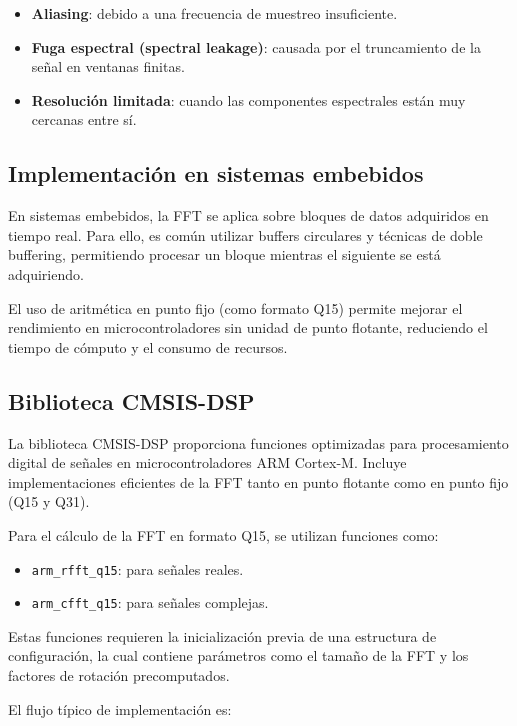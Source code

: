 \documentclass[12pt]{article}
\begin{document}
    \begin{itemize}
        \item \textbf{Aliasing}: debido a una frecuencia de muestreo insuficiente.
        \item \textbf{Fuga espectral (spectral leakage)}: causada por el truncamiento de la señal en ventanas finitas.
        \item \textbf{Resolución limitada}: cuando las componentes espectrales están muy cercanas entre sí.
    \end{itemize}

    \subsection{Implementación en sistemas embebidos}

    En sistemas embebidos, la FFT se aplica sobre bloques de datos adquiridos en tiempo real. Para ello, es común utilizar buffers circulares y técnicas de doble buffering, permitiendo procesar un bloque mientras el siguiente se está adquiriendo.

    El uso de aritmética en punto fijo (como formato Q15) permite mejorar el rendimiento en microcontroladores sin unidad de punto flotante, reduciendo el tiempo de cómputo y el consumo de recursos.

    \subsection{Biblioteca CMSIS-DSP}

    La biblioteca CMSIS-DSP proporciona funciones optimizadas para procesamiento digital de señales en microcontroladores ARM Cortex-M. Incluye implementaciones eficientes de la FFT tanto en punto flotante como en punto fijo (Q15 y Q31).

    Para el cálculo de la FFT en formato Q15, se utilizan funciones como:

    \begin{itemize}
        \item \texttt{arm\_rfft\_q15}: para señales reales.
        \item \texttt{arm\_cfft\_q15}: para señales complejas.
    \end{itemize}

    Estas funciones requieren la inicialización previa de una estructura de configuración, la cual contiene parámetros como el tamaño de la FFT y los factores de rotación precomputados.

    El flujo típico de implementación es:
\end{document}
